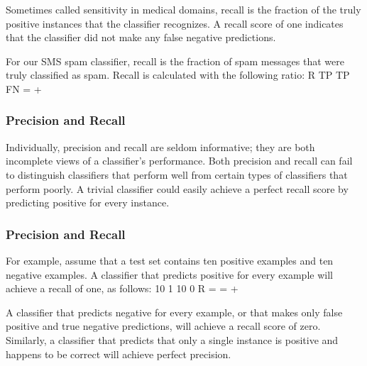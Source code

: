 \documentclass[PredictiveAnalytics101.tex]{subfiles}
\begin{document}
\begin{frame}
Sometimes called sensitivity in medical domains, recall is the fraction of the truly
positive instances that the classifier recognizes. A recall score of one indicates
that the classifier did not make any false negative predictions. 

For our SMS spam
classifier, recall is the fraction of spam messages that were truly classified as spam.
Recall is calculated with the following ratio:
R TP
TP FN
=
+
\end{frame}
\begin{frame}
\frametitle{Precision and Recall}
Individually, precision and recall are seldom informative; they are both incomplete
views of a classifier's performance. Both precision and recall can fail to distinguish
classifiers that perform well from certain types of classifiers that perform poorly. A
trivial classifier could easily achieve a perfect recall score by predicting positive for
every instance. 
\end{frame}
\begin{frame}
\frametitle{Precision and Recall}
For example, assume that a test set contains ten positive examples
and ten negative examples. A classifier that predicts positive for every example will
achieve a recall of one, as follows:
10 1
10 0
R = =
+
\end{frame}
\begin{frame}
A classifier that predicts negative for every example, or that makes only false positive
and true negative predictions, will achieve a recall score of zero. Similarly, a classifier
that predicts that only a single instance is positive and happens to be correct will
achieve perfect precision.
\end{frame}
\end{document}
